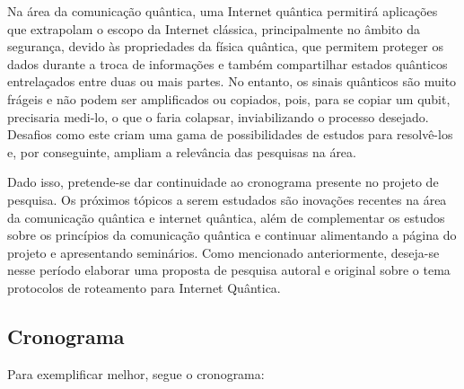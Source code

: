\documentclass{article}
\begin{document}
     Na área da comunicação quântica, uma Internet quântica permitirá aplicações que extrapolam o escopo da Internet clássica, principalmente no âmbito da segurança, devido às propriedades da física quântica, que permitem proteger os dados durante a troca de informações e também compartilhar estados quânticos entrelaçados entre duas ou mais partes. No entanto, os sinais quânticos são muito frágeis e não podem ser amplificados ou copiados, pois, para se copiar um qubit, precisaria medi-lo, o que o faria colapsar, inviabilizando o processo desejado. Desafios como este criam uma gama de possibilidades de estudos para resolvê-los e, por conseguinte, ampliam a relevância das pesquisas na área.

     Dado isso, pretende-se dar continuidade ao cronograma presente no projeto de pesquisa. Os próximos tópicos a serem estudados são inovações recentes na área da comunicação quântica e internet quântica, além de complementar os estudos sobre os princípios da comunicação quântica e continuar alimentando a página do projeto e apresentando seminários. Como mencionado anteriormente, deseja-se nesse período elaborar uma proposta de pesquisa autoral e original sobre o tema protocolos de roteamento para Internet Quântica. 

\subsection{Cronograma}
Para exemplificar melhor, segue o cronograma:
\end{document}
